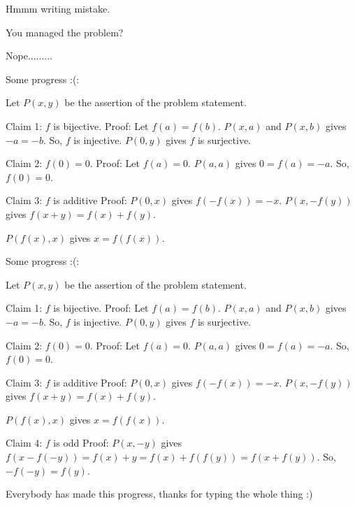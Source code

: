 \begin{solution}
	\begin{tcolorbox}Hmmm writing mistake.\end{tcolorbox}

You managed the problem?
\end{solution}



\begin{solution}
	Nope.........
\end{solution}



\begin{solution}
	Some progress :(:

Let $P(x,y)$ be the assertion of the problem statement.

Claim 1: $f$ is bijective.
Proof: Let $f(a)=f(b)$. $P(x,a)$ and $P(x,b)$ gives $-a=-b$. So, $f$ is injective. $P(0,y)$ gives $f$ is surjective.

Claim 2: $f(0)=0$.
Proof: Let $f(a)=0$. $P(a,a)$ gives $0=f(a)=-a$. So, $f(0)=0$.

Claim 3: $f$ is additive
Proof: $P(0,x)$ gives $f(-f(x))=-x$. $P(x,-f(y))$ gives $f(x+y)=f(x)+f(y)$.

$P(f(x),x)$ gives $x=f(f(x))$.
\end{solution}



\begin{solution}
	\begin{tcolorbox}Some progress :(:

Let $P(x,y)$ be the assertion of the problem statement.

Claim 1: $f$ is bijective.
Proof: Let $f(a)=f(b)$. $P(x,a)$ and $P(x,b)$ gives $-a=-b$. So, $f$ is injective. $P(0,y)$ gives $f$ is surjective.

Claim 2: $f(0)=0$.
Proof: Let $f(a)=0$. $P(a,a)$ gives $0=f(a)=-a$. So, $f(0)=0$.

Claim 3: $f$ is additive
Proof: $P(0,x)$ gives $f(-f(x))=-x$. $P(x,-f(y))$ gives $f(x+y)=f(x)+f(y)$.

$P(f(x),x)$ gives $x=f(f(x))$.

Claim 4: $f$ is odd
Proof: $P(x,-y)$ gives $f(x-f(-y))=f(x)+y = f(x)+f(f(y))=f(x+f(y))$. So, $-f(-y)=f(y)$.\end{tcolorbox}

Everybody has made this progress, thanks for typing the whole thing  :) 
\end{solution}



